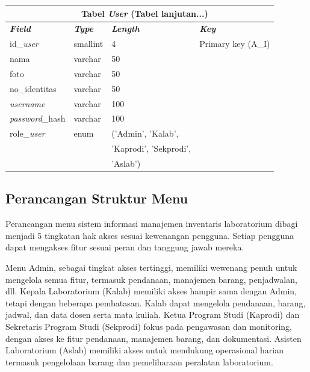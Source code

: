 \begin{enumerate}
{\begin{longtable}{l l l l}
				      \multicolumn{4}{c}{\tablename\ \thetable\ {Tabel \textit{User}} \space (Tabel lanjutan...)}         \\
				      \hline
				      \textbf{\textit{Field}} & \textbf{\textit{Type}} & \textbf{\textit{Length}} & \textbf{\textit{Key}} \\
				      \hline
				      \endhead

				      id\_\textit{user}       & smallint               & 4                        & Primary key (A\_I)    \\
				      nama                    & varchar                & 50                       &                       \\
				      foto                    & varchar                & 50                       &                       \\
				      no\_identitas           & varchar                & 50                       &                       \\
				      \textit{username}       & varchar                & 100                      &                       \\
				      \textit{password}\_hash & varchar                & 100                      &                       \\
				      role\_\textit{user}     & enum                   & ('Admin', 'Kalab',       &                       \\
				                              &                        & 'Kaprodi', 'Sekprodi',   &                       \\
				                              &                        & 'Aslab')                 &                       \\
				      \hline
			      \end{longtable}
		      }

\end{enumerate}

\subsection{Perancangan Struktur Menu}
Perancangan menu sistem informasi manajemen inventaris laboratorium dibagi menjadi 5 tingkatan hak akses sesuai kewenangan pengguna. Setiap pengguna dapat mengakses fitur sesuai peran dan tanggung jawab mereka.

Menu Admin, sebagai tingkat akses tertinggi, memiliki wewenang penuh untuk mengelola semua fitur, termasuk pendanaan, manajemen barang, penjadwalan, dll. Kepala Laboratorium (Kalab) memiliki akses hampir sama dengan Admin, tetapi dengan beberapa pembatasan. Kalab dapat mengelola pendanaan, barang, jadwal, dan data dosen serta mata kuliah. Ketua Program Studi (Kaprodi) dan Sekretaris Program Studi (Sekprodi) fokus pada pengawasan dan monitoring, dengan akses ke fitur pendanaan, manajemen barang, dan dokumentasi. Asisten Laboratorium (Aslab) memiliki akses untuk mendukung operasional harian termasuk pengelolaan barang dan pemeliharaan peralatan laboratorium.

